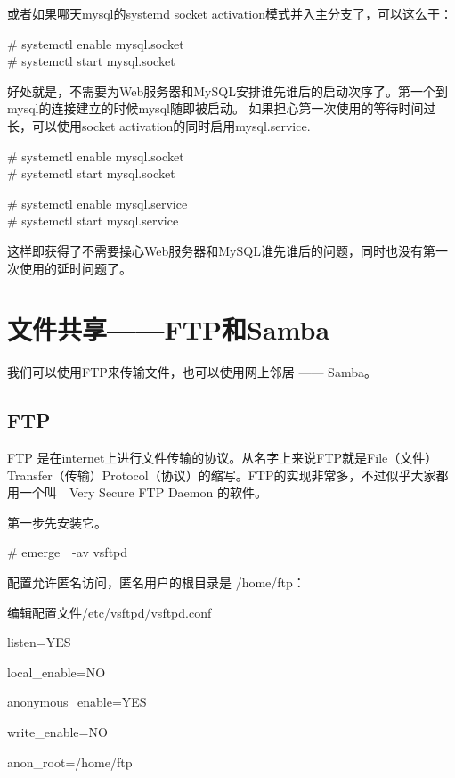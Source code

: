 或者如果哪天mysql的systemd socket activation模式并入主分支了，可以这么干：

\begin{code}
\# systemctl enable mysql.socket\\
\# systemctl start mysql.socket
\end{code}

好处就是，不需要为Web服务器和MySQL安排谁先谁后的启动次序了。第一个到mysql的连接建立的时候mysql随即被启动。
如果担心第一次使用的等待时间过长，可以使用socket activation的同时启用mysql.service.


\begin{code}
\# systemctl enable mysql.socket\\
\# systemctl start mysql.socket

\# systemctl enable mysql.service\\
\# systemctl start mysql.service
\end{code}

这样即获得了不需要操心Web服务器和MySQL谁先谁后的问题，同时也没有第一次使用的延时问题了。

\section{文件共享——FTP和Samba}

我们可以使用FTP来传输文件，也可以使用网上邻居 —— Samba。

\subsection{FTP}

FTP 是在internet上进行文件传输的协议。从名字上来说FTP就是File（文件）Transfer（传输）Protocol（协议）的缩写。FTP的实现非常多，不过似乎大家都用一个叫　Very Secure FTP Daemon 的软件。

第一步先安装它。
\begin{code}
\# emerge　-av vsftpd
\end{code}

配置允许匿名访问，匿名用户的根目录是 /home/ftp：

编辑配置文件/etc/vsftpd/vsftpd.conf
\begin{code}

listen=YES

local\_enable=NO

anonymous\_enable=YES

write\_enable=NO

anon\_root=/home/ftp
\end{code}

